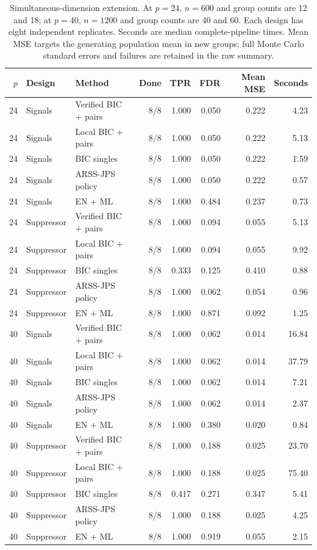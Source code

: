 \begin{table}[H]\centering\small
\begin{tabular}{rllrrrrr}\toprule
$p$ & Design & Method & Done & TPR & FDR & Mean MSE & Seconds\\\midrule
24 & Signals & Verified BIC + pairs & 8/8 & 1.000 & 0.050 & 0.222 & 4.23 \\
24 & Signals & Local BIC + pairs & 8/8 & 1.000 & 0.050 & 0.222 & 5.13 \\
24 & Signals & BIC singles & 8/8 & 1.000 & 0.050 & 0.222 & 1.59 \\
24 & Signals & ARSS-JPS policy & 8/8 & 1.000 & 0.050 & 0.222 & 0.57 \\
24 & Signals & EN + ML & 8/8 & 1.000 & 0.484 & 0.237 & 0.73 \\
\midrule
24 & Suppressor & Verified BIC + pairs & 8/8 & 1.000 & 0.094 & 0.055 & 5.13 \\
24 & Suppressor & Local BIC + pairs & 8/8 & 1.000 & 0.094 & 0.055 & 9.92 \\
24 & Suppressor & BIC singles & 8/8 & 0.333 & 0.125 & 0.410 & 0.88 \\
24 & Suppressor & ARSS-JPS policy & 8/8 & 1.000 & 0.062 & 0.054 & 0.96 \\
24 & Suppressor & EN + ML & 8/8 & 1.000 & 0.871 & 0.092 & 1.25 \\
\midrule
40 & Signals & Verified BIC + pairs & 8/8 & 1.000 & 0.062 & 0.014 & 16.84 \\
40 & Signals & Local BIC + pairs & 8/8 & 1.000 & 0.062 & 0.014 & 37.79 \\
40 & Signals & BIC singles & 8/8 & 1.000 & 0.062 & 0.014 & 7.21 \\
40 & Signals & ARSS-JPS policy & 8/8 & 1.000 & 0.062 & 0.014 & 2.37 \\
40 & Signals & EN + ML & 8/8 & 1.000 & 0.380 & 0.020 & 0.84 \\
\midrule
40 & Suppressor & Verified BIC + pairs & 8/8 & 1.000 & 0.188 & 0.025 & 23.70 \\
40 & Suppressor & Local BIC + pairs & 8/8 & 1.000 & 0.188 & 0.025 & 75.40 \\
40 & Suppressor & BIC singles & 8/8 & 0.417 & 0.271 & 0.347 & 5.41 \\
40 & Suppressor & ARSS-JPS policy & 8/8 & 1.000 & 0.188 & 0.025 & 4.25 \\
40 & Suppressor & EN + ML & 8/8 & 1.000 & 0.919 & 0.055 & 2.15 \\
\bottomrule\end{tabular}
\caption{Simultaneous-dimension extension. At $p=24$, $n=600$ and group counts
are 12 and 18; at $p=40$, $n=1200$ and group counts are 40 and 60. Each design has
eight independent replicates. Seconds are median complete-pipeline times.
Mean MSE targets the generating population mean in new groups; full Monte
Carlo standard errors and failures are retained in the raw summary.}
\end{table}
